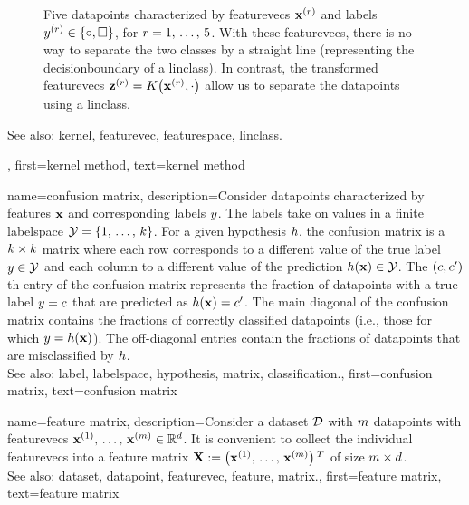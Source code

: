 {{\begin{figure}[H]
\begin{center}
\end{center}
\caption{
Five \glspl{datapoint} characterized by \glspl{featurevec} ${\bf x}^{(r)}$ 
and \glspl{label} $y^{(r)} \in \{ \circ, \square \}$, for $r=1, \,\ldots, \,5$. 
With these \glspl{featurevec}, there is no way to separate the two classes 
by a straight line (representing the \gls{decisionboundary} of a \gls{linclass}). 
In contrast, the transformed \glspl{featurevec} ${\bf z}^{(r)} = K\big({\bf x}^{(r)},\cdot\big)$ 
allow us to separate the \glspl{datapoint} using a \gls{linclass}.  \label{fig_linsep_kernel_dict}}
\end{figure}
		See also: \gls{kernel}, \gls{featurevec}, \gls{featurespace}, \gls{linclass}.},
	first={kernel method},
	text={kernel method} 
}
	

{name={confusion matrix}, 
	description={Consider \glspl{datapoint} characterized 
		by \glspl{feature} ${\bf x}$ and corresponding \glspl{label} $y$. 
		The \glspl{label} take on values in a finite \gls{labelspace} $\mathcal{Y} = \{1, \,\ldots, \,k\}$. 
		For a given \gls{hypothesis} $h$, the confusion \gls{matrix} is a 
		$k \times k$ \gls{matrix} where each row corresponds to a different 
		value of the true \gls{label} $y \in \mathcal{Y}$ and each column to a 
		different value of the \gls{prediction} $h({\bf x}) \in \mathcal{Y}$. 
		The $(c,c')$th entry of the confusion \gls{matrix} represents the fraction of 
		\glspl{datapoint} with a true \gls{label} $y = c$ that are predicted as 
		$h({\bf x}) = c'$. The main diagonal of the confusion \gls{matrix} 
		contains the fractions of correctly classified \glspl{datapoint} (i.e., those for which 
		$y = h({\bf x})$). The off-diagonal entries contain the fractions of
		\glspl{datapoint} that are misclassified by $h$.
				\\
		See also: \gls{label}, \gls{labelspace}, \gls{hypothesis}, \gls{matrix}, \gls{classification}.},
	first={confusion matrix},
	text={confusion matrix} 
}


{name={feature matrix}, 
	description={Consider a \gls{dataset} $\mathcal{D}$ 
		with $m$ \glspl{datapoint} with \glspl{featurevec} 
		${\bf x}^{(1)}, \,\ldots, \,{\bf x}^{(m)} \in \mathbb{R}^{d}$. 
		It is convenient to collect the individual \glspl{featurevec} into a \gls{feature} 
		\gls{matrix} ${\bf X} := \big({\bf x}^{(1)}, \,\ldots, \,{\bf x}^{(m)}\big)\,^{T}$ 
		of size $m \times d$.
				\\
		See also: \gls{dataset}, \gls{datapoint}, \gls{featurevec}, \gls{feature}, \gls{matrix}.},
	first={feature matrix},
	text={feature matrix} 
}

